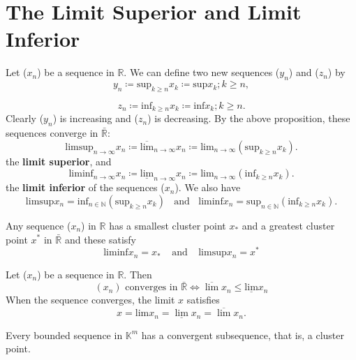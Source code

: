 \section{The Limit Superior and Limit Inferior}


\begin{definition}
    Let (\(x_n\)) be a sequence in \(\mathbb{R}\). We can define two new sequences 
    (\(y_n\)) and (\(z_n\)) by 
    \[
      \displaystyle  y_n \coloneqq \text{sup}_{k \geq n} x_k \coloneqq \text{sup}{x_k ; k \geq n}, 
    \] 
    
    \[ 
        z_n \coloneqq \text{inf}_{k \geq n} x_k \coloneqq \text{inf}{x_k ; k \geq n}.   
    \]
    Clearly (\(y_n\)) is increasing and (\(z_n\)) is decreasing. By the above proposition, 
    these sequences converge in \(\bar{\mathbb{R}}\):
    \[
      \displaystyle \text{limsup}_{n \to \infty} x_n \coloneqq \overline{\text{lim}}_{n\to \infty} 
      x_n \coloneqq \text{lim}_{n\to\infty}(\text{sup}_{k\geq n}x_k).  
    \]
    the \textbf{limit superior}, and 
    \[
        \displaystyle \text{liminf}_{n \to \infty} x_n \coloneqq \underline{\text{lim}}_{n\to \infty} 
        x_n \coloneqq \text{lim}_{n\to\infty}(\text{inf}_{k\geq n}x_k). 
    \]
    the \textbf{limit inferior} of the sequences (\(x_n\)). We also have
    \[
        \text{limsup}x_n = \text{inf}_{n\in \mathbb{N}}(\text{sup}_{k\geq n}x_k)
        \:\:\:\: \text{and} \:\:\:\: \text{liminf}x_n = \text{sup}_{n\in \mathbb{N}}
        (\text{inf}_{k\geq n} x_k).   
    \]
\end{definition}

\begin{theorem}
    Any sequence (\(x_n\)) in \(\mathbb{R}\) has a smallest cluster point \(x_{*}\)
    and a greatest cluster point \(x^*\) in \(\bar{\mathbb{R}}\) and these satisfy
    \[
        \text{liminf}x_n = x_* \:\:\:\:\: \text{and} \:\:\:\:\: \text{limsup}x_n = x^*   
    \]
\end{theorem}

\begin{theorem}
    Let (\(x_n\)) be a sequence in \(\mathbb{R}\). Then 
    \[
        (x_n) \text{ converges in } \bar{\mathbb{R}} \Leftrightarrow 
        \overline{\lim} x_n \leq \underline{\text{lim}}x_n 
    \]
    When the sequence converges, the limit \(x\) satisfies
    \[
        x = \text{lim}x_n = \underline{\lim} x_n = \overline{\lim} x_n.
    \]
\end{theorem}

\begin{theorem} \label{theorem: bolzano-weierstrass}
    Every bounded sequence in \(\mathbb{K}^m\) has a convergent subsequence,
    that is, a cluster point. 
\end{theorem}

